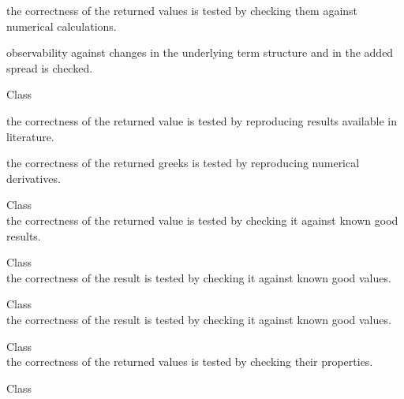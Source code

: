 \begin{DoxyRefList}
\begin{DoxyItemize}
\item the correctness of the returned values is tested by checking them against numerical calculations.
\item observability against changes in the underlying term structure and in the added spread is checked. 
\end{DoxyItemize}
\item[Class \doxylink{class_quant_lib_1_1_forward_vanilla_engine}{Quant\+Lib\+::Forward\+Vanilla\+Engine\texorpdfstring{$<$}{<} Engine \texorpdfstring{$>$}{>}} ]\hfill \\
\label{test__test000122}%
%

\begin{DoxyItemize}
\item the correctness of the returned value is tested by reproducing results available in literature.
\item the correctness of the returned greeks is tested by reproducing numerical derivatives. 
\end{DoxyItemize}
\item[Class \doxylink{class_quant_lib_1_1_gamma_function}{Quant\+Lib\+::Gamma\+Function} ]\hfill \\
\label{test__test000034}%
%
the correctness of the returned value is tested by checking it against known good results.  
\item[Class \doxylink{class_quant_lib_1_1_gaussian_quadrature}{Quant\+Lib\+::Gaussian\+Quadrature} ]\hfill \\
\label{test__test000042}%
%
the correctness of the result is tested by checking it against known good values.  
\item[Class \doxylink{class_quant_lib_1_1_gauss_kronrod_adaptive}{Quant\+Lib\+::Gauss\+Kronrod\+Adaptive} ]\hfill \\
\label{test__test000043}%
%
the correctness of the result is tested by checking it against known good values.  
\item[Class \doxylink{class_quant_lib_1_1_general_linear_least_squares}{Quant\+Lib\+::General\+Linear\+Least\+Squares} ]\hfill \\
\label{test__test000040}%
%
the correctness of the returned values is tested by checking their properties.  
\item[Class \doxylink{class_quant_lib_1_1_generic_sequence_statistics}{Quant\+Lib\+::Generic\+Sequence\+Statistics\texorpdfstring{$<$}{<} Statistics\+Type \texorpdfstring{$>$}{>}} ]\hfill \\

\end{DoxyRefList}
